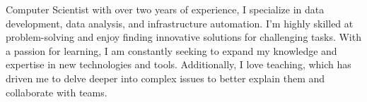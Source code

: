 

\begin{cvparagraph}


  Computer Scientist with over two years of experience, I
  specialize in data development, data analysis, and infrastructure automation.
  I'm highly skilled at problem-solving and enjoy finding innovative solutions
  for challenging tasks. With a passion for learning, I am constantly seeking
  to expand my knowledge and expertise in new technologies and tools.
  Additionally, I love teaching, which has driven me to delve deeper into
  complex issues to better explain them and collaborate with teams.


\end{cvparagraph}

